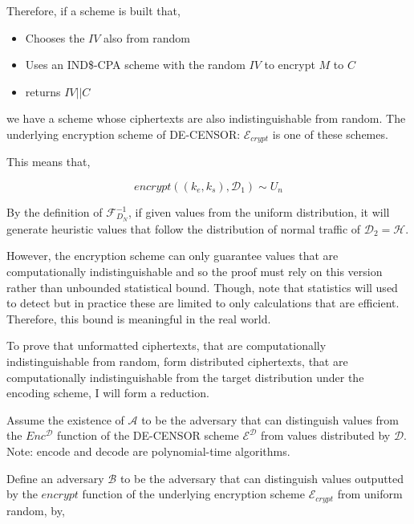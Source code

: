 \documentclass[ %
                    author={Samuel Russell},
                supervisor={Prof. Bogdan Warinschi},
                    degree={MEng},
                     title={Innocuous Ciphertexts},
                  subtitle={The DE-CENSOR Scheme},
                      type={research},
                      year={2018} ]{dissertation}
\begin{document}
Therefore, if a scheme is built that,
\begin{itemize}
\item Chooses the $IV$ also from random
\item Uses an IND\$-CPA scheme with the random $IV$ to encrypt $M$ to $C$
\item returns $IV || C$
\end{itemize}

we have a scheme whose ciphertexts are also indistinguishable from random.
The underlying encryption scheme of DE-CENSOR: $\mathcal{E}_{crypt}$ is one of these schemes.

This means that,

$$ encrypt \left( (k_e, k_s), \mathcal{D}_1 \right) \sim  U_n$$


By the definition of $\mathcal{F}^{-1}_{D_N}$, if given values from the uniform distribution, it will generate heuristic values that follow the distribution of normal traffic of $\mathcal{D}_2 = \mathcal{H}$.

However, the encryption scheme can only guarantee values that are computationally indistinguishable and so the proof must rely on this version rather than unbounded statistical bound.
Though, note that statistics will used to detect but in practice these are limited to only calculations that are efficient.
Therefore, this bound is meaningful in the real world.

To prove that unformatted ciphertexts, that are computationally indistinguishable from random, form distributed ciphertexts, that are computationally indistinguishable from the target distribution under the encoding scheme, I will form a reduction.


Assume the existence of $\mathcal{A}$ to be the adversary that can distinguish values from the $Enc^{\mathcal{D}}$ function of the DE-CENSOR scheme $\mathcal{E}^\mathcal{D}$ from values distributed by $\mathcal{D}$. Note: encode and decode are polynomial-time algorithms.

Define an adversary $\mathcal{B}$ to be the adversary that can distinguish values outputted by the $encrypt$ function of the underlying encryption scheme $\mathcal{E}_{crypt}$ from uniform random, by,
\end{document}
